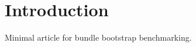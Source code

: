 \documentclass{article}
\begin{document}
\section{Introduction}
Minimal article for bundle bootstrap benchmarking.
\end{document}
